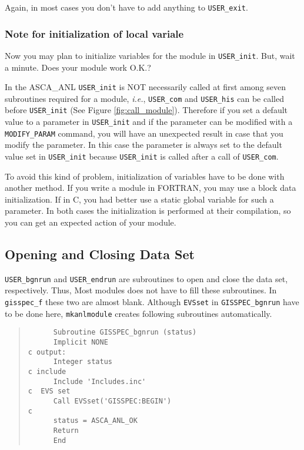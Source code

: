 Again, in most cases
you don't have to add anything to {\tt USER\_exit}.

\subsubsection{Note for initialization of local variale}
Now you may plan to initialize variables for the module in {\tt USER\_init}.
But, wait a minute. Does your module work O.K.?

In the ASCA\_ANL
{\tt USER\_init} is NOT necessarily called at first
among seven subroutines required for a module,
{\em i.e.},
{\tt USER\_com} and {\tt USER\_his} can be called before {\tt USER\_init}
(See Figure \ref{fig:call_module}).
Therefore
if you set a default value to a parameter in {\tt USER\_init}
and if the parameter can be modified with a {\tt MODIFY\_PARAM} command,
you will have an unexpected result in case that you modify the parameter.
In this case
the parameter is always set to the default value set in {\tt USER\_init}
because {\tt USER\_init} is called after a call of {\tt USER\_com}.

To avoid this kind of problem,
initialization of variables have to be done with another method.
If you write a module in FORTRAN,
you may use a block data initialization.
If in C,
you had better use a static global variable for such a parameter.
In both cases
the initialization is performed at their compilation,
so you can get an expected action of your module.

\subsection{Opening and Closing Data Set}
{\tt USER\_bgnrun} and {\tt USER\_endrun} are subroutines
to open and close the data set, respectively.
Thus,
Most modules does not have to fill these subroutines.
In {\tt gisspec\_f} these two are almost blank.
Although {\tt EVSset} in {\tt GISSPEC\_bgnrun} have to be done here,
{\tt mkanlmodule} creates following subroutines automatically.

\begin{quote}\baselineskip 3.2mm\begin{verbatim}
      Subroutine GISSPEC_bgnrun (status)
      Implicit NONE
c output:
      Integer status
c include
      Include 'Includes.inc'
c  EVS set
      Call EVSset('GISSPEC:BEGIN')
c
      status = ASCA_ANL_OK
      Return
      End
\end{verbatim}\end{quote}


